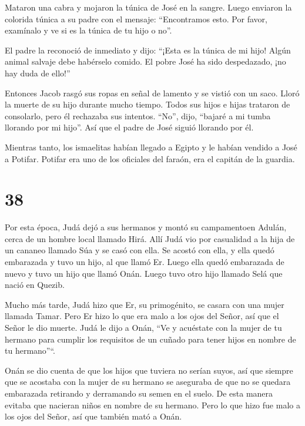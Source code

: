  Mataron una cabra y mojaron la túnica de José en la
sangre.  Luego enviaron la colorida túnica a su padre con
el mensaje: ``Encontramos esto. Por favor, examínalo y ve si es la
túnica de tu hijo o no''.

 El padre la reconoció de inmediato y dijo: ``¡Esta es la
túnica de mi hijo! Algún animal salvaje debe habérselo comido. El pobre
José ha sido despedazado, ¡no hay duda de ello!''

 Entonces Jacob rasgó sus ropas en señal de lamento y se
vistió con un saco. Lloró la muerte de su hijo durante mucho tiempo.
 Todos sus hijos e hijas trataron de consolarlo, pero él
rechazaba sus intentos. ``No'', dijo, ``bajaré a mi tumba llorando por
mi hijo''. Así que el padre de José siguió llorando por él.

 Mientras tanto, los ismaelitas habían llegado a Egipto y
le habían vendido a José a Potifar. Potifar era uno de los oficiales del
faraón, era el capitán de la guardia.

\hypertarget{section-37}{%
\section{38}\label{section-37}}

 Por esta época, Judá dejó a sus hermanos y montó su
campamentoen Adulán, cerca de un hombre local llamado Hirá. 
Allí Judá vio por casualidad a la hija de un cananeo llamado Súa y se
casó con ella. Se acostó con ella,  y ella quedó embarazada
y tuvo un hijo, al que llamó Er.  Luego ella quedó
embarazada de nuevo y tuvo un hijo que llamó Onán.  Luego
tuvo otro hijo llamado Selá que nació en Quezib.

 Mucho más tarde, Judá hizo que Er, su primogénito, se
casara con una mujer llamada Tamar.  Pero Er hizo lo que era
malo a los ojos del Señor, así que el Señor le dio muerte. 
Judá le dijo a Onán, ``Ve y acuéstate con la mujer de tu hermano para
cumplir los requisitos de un cuñado para tener hijos en nombre de tu
hermano''``.

 Onán se dio cuenta de que los hijos que tuviera no serían
suyos, así que siempre que se acostaba con la mujer de su hermano se
aseguraba de que no se quedara embarazada retirando y derramando su
semen en el suelo. De esta manera evitaba que nacieran niños en nombre
de su hermano.  Pero lo que hizo fue malo a los ojos del
Señor, así que también mató a Onán.


